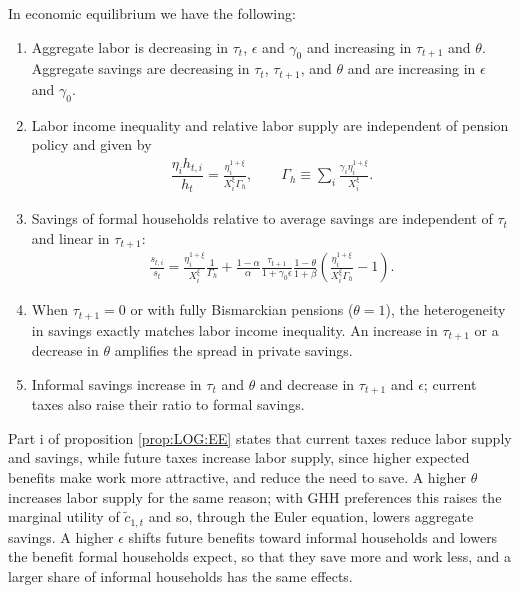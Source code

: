 \begin{proposition}\label{prop:LOG:EE}
In economic equilibrium we have the following:
\begin{enumerate}
    \item Aggregate labor is decreasing in $\tau_t$, $\epsilon$ and $\gamma_0$ and increasing in $\tau_{t+1}$ and $\theta$. Aggregate savings are decreasing in $\tau_t$, $\tau_{t+1}$, and $\theta$ and are increasing in $\epsilon$ and $\gamma_0$.
    \item Labor income inequality and relative labor supply are independent of pension policy and given by
    \begin{align}
        \dfrac{\eta_ih_{t,i}}{h_t} = \frac{\eta_i^{1+\xi}}{X_i^{\xi}\Gamma_h}, \qquad \Gamma_h \equiv \sum_i \frac{\gamma_i\eta_i^{1+\xi}}{X_i^{\xi}}.
    \end{align}
    \item Savings of formal households relative to average savings are independent of $\tau_t$ and linear in $\tau_{t+1}$:
    \begin{align}
        \frac{s_{t,i}}{s_t} = \frac{\eta_i^{1+\xi}}{X_i^{\xi}} \frac{1}{\Gamma_h} + \frac{1-\alpha}{\alpha} \frac{\tau_{t+1}}{1+\gamma_0\epsilon}\frac{1-\theta}{1+\beta}\left(\frac{\eta_i^{1+\xi}}{X_i^{\xi}\Gamma_h}-1\right).
    \end{align}
    \item When $\tau_{t+1}=0$ or with fully Bismarckian pensions ($\theta = 1$), the heterogeneity in savings exactly matches labor income inequality. An increase in $\tau_{t+1}$ or a decrease in $\theta$ amplifies the spread in private savings.
    \item Informal savings increase in $\tau_t$ and $\theta$ and decrease in $\tau_{t+1}$ and $\epsilon$; current taxes also raise their ratio to formal savings.
\end{enumerate}
\end{proposition}


Part i of proposition \ref{prop:LOG:EE} states that current taxes reduce labor supply and savings, while future taxes increase labor supply, since higher expected benefits make work more attractive, and reduce the need to save. A higher $\theta$ increases labor supply for the same reason; with GHH preferences this raises the marginal utility of $\tilde{c}_{1,t}$ and so, through the Euler equation, lowers aggregate savings. A higher $\epsilon$ shifts future benefits toward informal households and lowers the benefit formal households expect, so that they save more and work less, and a larger share of informal households has the same effects.

